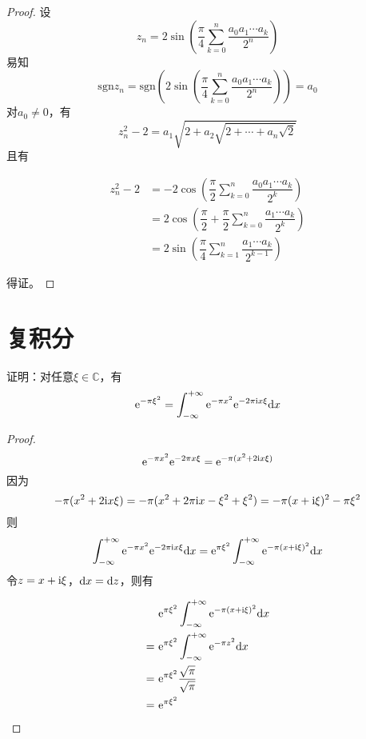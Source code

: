 \begin{proof}

    设
    $$z_n = 2 \sin{\left( \dfrac{\pi}{4} \sum\limits_{k = 0}^{n}{\dfrac{a_0 a_1 \cdots a_k}{2^n}} \right)}$$
    易知
    $$\mathrm{sgn}{z_n} = \mathrm{sgn}\left( 2 \sin{\left( \dfrac{\pi}{4} \sum\limits_{k = 0}^{n}{\dfrac{a_0 a_1 \cdots a_k}{2^n}} \right)} \right) = a_0$$
    对$a_0 \neq 0$，有
    $$z_n^2 - 2 = a_1\sqrt{2 + a_2\sqrt{2 + \cdots + a_n\sqrt{2}}}$$
    且有

    \begin{align*}
        z_n^2 - 2 & = -2 \cos{\left( \dfrac{\pi}{2}\sum\limits_{k = 0}^{n}{\dfrac{a_0 a_1 \cdots a_k}{2^k}} \right)} \\
        & = 2 \cos{\left( \dfrac{\pi}{2} + \dfrac{\pi}{2}\sum\limits_{k = 0}^{n}{\dfrac{a_1 \cdots a_k}{2^k}} \right)} \\
        & = 2 \sin{\left( \dfrac{\pi}{4}\sum\limits_{k = 1}^{n}{\dfrac{a_1 \cdots a_k}{2^{k - 1}}} \right)}
    \end{align*}

    得证。

\end{proof}

\section{复积分}

\begin{proposition}

    证明：对任意$ \xi \in \mathbb{C}$，有
    $$\mathrm{e}^{-\pi\xi^2} = \int_{-\infty}^{+\infty}{\mathrm{e}^{-\pi x^2}\mathrm{e}^{-2\pi \mathrm{i} x\xi}}\mathrm{d} x$$
    
\end{proposition}

\begin{proof}

    $$\mathrm{e}^{-\pi x^2}\mathrm{e}^{-2\pi x\xi} = \mathrm{e}^{-\pi(x^2 + 2\mathrm{i} x\xi)}$$
    因为
    $$-\pi(x^2 + 2\mathrm{i} x\xi) = -\pi (x^2 + 2\pi\mathrm{i} x - \xi^2 + \xi^2) = -\pi(x + \mathrm{i} \xi)^2 - \pi\xi^2$$
    则
    $$\int_{-\infty}^{+\infty}{\mathrm{e}^{-\pi x^2}\mathrm{e}^{-2\pi \mathrm{i} x\xi}}\mathrm{d} x = \mathrm{e}^{\pi\xi^2} \int_{-\infty}^{+\infty}{\mathrm{e}^{-\pi (x + \mathrm{i}\xi)^2}}\mathrm{d} x$$
    令$z = x + \mathrm{i}\xi$，$\mathrm{d} x = \mathrm{d} z$，则有

    \begin{align*}
        & \mathrm{e}^{\pi\xi^2} \int_{-\infty}^{+\infty}{\mathrm{e}^{-\pi (x + \mathrm{i}\xi)^2}}\mathrm{d} x \\
        = \ & \mathrm{e}^{\pi\xi^2} \int_{-\infty}^{+\infty}{\mathrm{e}^{-\pi z^2}}\mathrm{d} x \\
        = \ & \mathrm{e}^{\pi\xi^2} \dfrac{\sqrt{\pi}}{\sqrt{\pi}} \\
        = \ & \mathrm{e}^{\pi\xi^2}
    \end{align*}

\end{proof}

